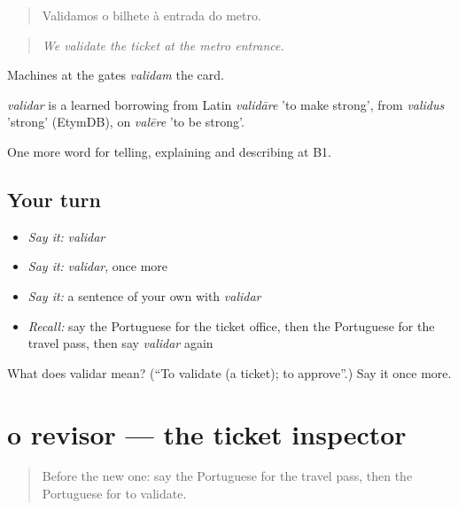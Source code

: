 \begin{quote}
Validamos o bilhete à entrada do metro.
\end{quote}

\begin{quote}
\emph{We validate the ticket at the metro entrance.}
\end{quote}

Machines at the gates \emph{validam} the card.

\begin{cousinweb}
\emph{validar} is a learned borrowing from Latin \emph{validāre} 'to make strong', from \emph{validus} 'strong' (EtymDB), on \emph{valēre} 'to be strong'.
\end{cousinweb}

\begin{grammarlens}[title={What you've built}]
One more word for telling, explaining and describing at B1.
\end{grammarlens}

\subsection*{Your turn}
\begin{itemize}
\raggedright
  \item \emph{Say it:} \emph{validar}
  \item \emph{Say it:} \emph{validar}, once more
  \item \emph{Say it:} a sentence of your own with \emph{validar}
  \item \emph{Recall:} say the Portuguese for the ticket office, then the Portuguese for the travel pass, then say \emph{validar} again
\end{itemize}

\begin{tcolorbox}[breakable,colback=teal!4,colframe=teal!35!black,title={Before you move on}]
What does validar mean? (\textquotedblleft{}To validate (a ticket); to approve\textquotedblright{}.) Say it once more.
\end{tcolorbox}
\section[o revisor]{o revisor — the ticket inspector}

\label{lesson:PT-C414-revisor}



\begin{quote}
Before the new one: say the Portuguese for the travel pass, then the Portuguese for to validate.
\end{quote}

